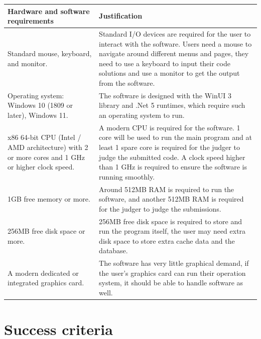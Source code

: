\documentclass[a4paper]{report}
\begin{document}
\begin{tabulary}{\linewidth}{|L|L|}
    \hline
    Hardware and software requirements & Justification \\
    \hline
    Standard mouse, keyboard, and monitor. & Standard I/O devices are required for the user to interact with the software. Users need a mouse to navigate around different menus and pages, they need to use a keyboard to input their code solutions and use a monitor to get the output from the software. \\
    \hline
    Operating system: Windows 10 (1809 or later), Windows 11. & The software is designed with the WinUI 3 library and .Net 5 runtimes, which require such an operating system to run. \\
    \hline
    x86 64-bit CPU (Intel / AMD architecture) with 2 or more cores and 1 GHz or higher clock speed. & A modern CPU is required for the software. 1 core will be used to run the main program and at least 1 spare core is required for the judger to judge the submitted code. A clock speed higher than 1 GHz is required to ensure the software is running smoothly. \\
    \hline
    1GB free memory or more. & Around 512MB RAM is required to run the software, and another 512MB RAM is required for the judger to judge the submissions. \\
    \hline
    256MB free disk space or more. & 256MB free disk space is required to store and run the program itself, the user may need extra disk space to store extra cache data and the database. \\
    \hline
    A modern dedicated or integrated graphics card. & The software has very little graphical demand, if the user's graphics card can run their operation system, it should be able to handle software as well. \\
    \hline
\end{tabulary}

\section{Success criteria}
\end{document}
